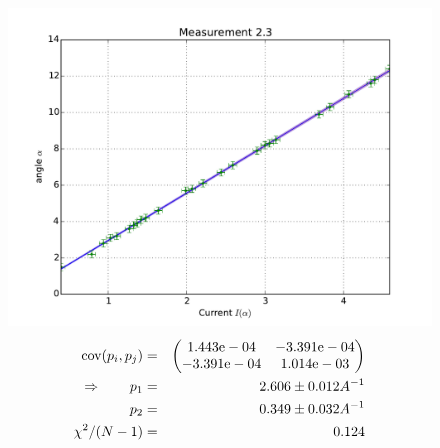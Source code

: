 \begin{figure}
    \begin{centering}
        \includegraphics[width=18cm]{figures/fig23}
\captionsetup{singlelinecheck=off} 
\caption[.]{
\begin{eqnarray*}
    \mathrm{cov}(p_i, p_j) &=& 
    \begin{pmatrix}
        1.443\mathrm{e}-04 &-3.391\mathrm{e}-04 \\
        -3.391\mathrm{e}-04 &1.014\mathrm{e}-03 \\
    \end{pmatrix}
\\ \Rightarrow \qquad
    p_1 &=& 2.606 \pm 0.012 A^{-1}\\
    p_2 &=& 0.349 \pm 0.032 A^{-1} \\
    \chi ^2/(N-1) &=&  0.124
\end{eqnarray*}
}
\label{fig:23}
    \end{centering}
\end{figure}


